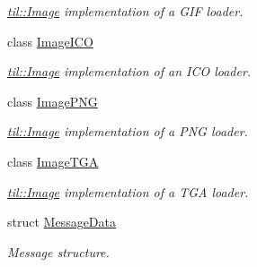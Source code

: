 \begin{DoxyCompactItemize}
\begin{DoxyCompactList}\small\item\em \hyperlink{classtil_1_1_image}{til::Image} implementation of a GIF loader. \item\end{DoxyCompactList}\item 
class \hyperlink{classtil_1_1_image_i_c_o}{ImageICO}
\begin{DoxyCompactList}\small\item\em \hyperlink{classtil_1_1_image}{til::Image} implementation of an ICO loader. \item\end{DoxyCompactList}\item 
class \hyperlink{classtil_1_1_image_p_n_g}{ImagePNG}
\begin{DoxyCompactList}\small\item\em \hyperlink{classtil_1_1_image}{til::Image} implementation of a PNG loader. \item\end{DoxyCompactList}\item 
class \hyperlink{classtil_1_1_image_t_g_a}{ImageTGA}
\begin{DoxyCompactList}\small\item\em \hyperlink{classtil_1_1_image}{til::Image} implementation of a TGA loader. \item\end{DoxyCompactList}\item 
struct \hyperlink{structtil_1_1_message_data}{MessageData}
\begin{DoxyCompactList}\small\item\em Message structure. \item\end{DoxyCompactList}\end{DoxyCompactItemize}
